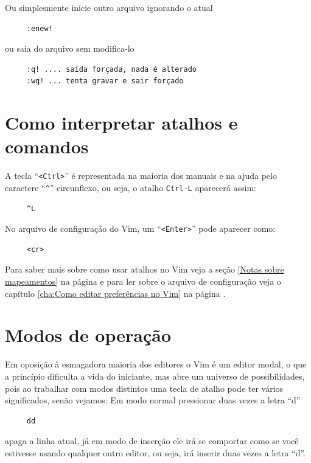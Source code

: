 \documentclass[10pt,a4paper,openany]{book}
\begin{document}
Ou simplesmente inicie outro arquivo ignorando o atual

\begin{verbatim}
     :enew!
\end{verbatim}

ou saia do arquivo sem modifica-lo

\begin{verbatim}
     :q! .... saída forçada, nada é alterado
     :wq! ... tenta gravar e sair forçado
\end{verbatim}

\section{Como interpretar atalhos e comandos}\label{Como interpretar atalhos e comandos}

A tecla ``\verb|<Ctrl>|'' é representada na maioria dos manuais e na ajuda
pelo caractere ``\verb|^|'' circunflexo, ou seja, o atalho \verb|Ctrl-L| aparecerá assim:

\begin{verbatim}
     ^L
\end{verbatim}

No arquivo de configuração do Vim, um ``\verb|<Enter>|'' pode aparecer como:

\begin{verbatim}
     <cr>
\end{verbatim}

Para saber mais sobre como usar atalhos no Vim veja a seção \ref{Notas sobre
mapeamentos} na página \pageref{Notas sobre mapeamentos} e para ler sobre o
arquivo de configuração veja o capítulo \ref{cha:Como editar preferências no Vim} na página
\pageref{cha:Como editar preferências no Vim}.


\section{Modos de operação}\label{Modos de operação}

Em oposição à esmagadora maioria dos editores o Vim é um editor modal, o que a
princípio dificulta a vida do iniciante, mas abre um universo de
possibilidades, pois ao trabalhar com modos distintos uma tecla de
atalho pode ter vários significados, senão vejamos:
Em modo normal pressionar duas vezes a letra ``d''
\begin{verbatim}
     dd
\end{verbatim}
apaga a linha atual, já em modo de inserção ele irá se comportar como se você estivesse
usando qualquer outro editor, ou seja, irá inserir duas vezes a letra ``d''.
\end{document}
